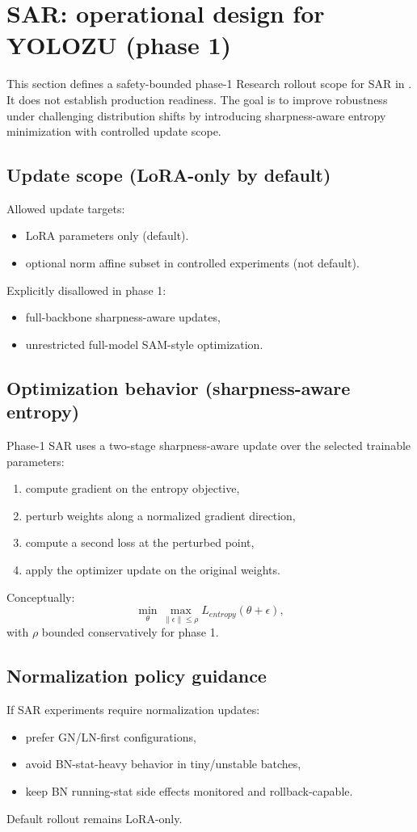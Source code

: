\section{SAR: operational design for YOLOZU (phase 1)}
This section defines a safety-bounded phase-1 Research rollout scope for SAR in
\yolozu{}. It does not establish production readiness.
The goal is to improve robustness under challenging distribution shifts by introducing sharpness-aware entropy minimization
with controlled update scope.

\subsection{Update scope (LoRA-only by default)}
Allowed update targets:
\begin{itemize}
  \item LoRA parameters only (default).
  \item optional norm affine subset in controlled experiments (not default).
\end{itemize}

Explicitly disallowed in phase 1:
\begin{itemize}
  \item full-backbone sharpness-aware updates,
  \item unrestricted full-model SAM-style optimization.
\end{itemize}

\subsection{Optimization behavior (sharpness-aware entropy)}
Phase-1 SAR uses a two-stage sharpness-aware update over the selected trainable parameters:
\begin{enumerate}
  \item compute gradient on the entropy objective,
  \item perturb weights along a normalized gradient direction,
  \item compute a second loss at the perturbed point,
  \item apply the optimizer update on the original weights.
\end{enumerate}

Conceptually:
\[
\min_{\theta} \max_{\left\| \epsilon \right\| \leq \rho} L_{entropy}(\theta + \epsilon),
\]
with $\rho$ bounded conservatively for phase 1.

\subsection{Normalization policy guidance}
If SAR experiments require normalization updates:
\begin{itemize}
  \item prefer GN/LN-first configurations,
  \item avoid BN-stat-heavy behavior in tiny/unstable batches,
  \item keep BN running-stat side effects monitored and rollback-capable.
\end{itemize}
Default rollout remains LoRA-only.

